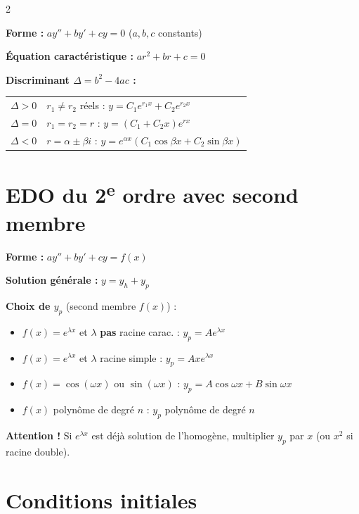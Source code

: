\documentclass[10pt,a4paper]{article}
\begin{document}
\begin{multicols}{2}
\begin{grisbox}
\textbf{Forme :} $ay'' + by' + cy = 0$ \quad ($a,b,c$ constants)

\textbf{Équation caractéristique :} $ar^2 + br + c = 0$

\textbf{Discriminant $\Delta = b^2 - 4ac$ :}

\renewcommand{\arraystretch}{1.4}
\begin{tabular}{@{}lp{4.5cm}@{}}
$\Delta > 0$ & $r_1 \neq r_2$ réels : $y = C_1 e^{r_1 x} + C_2 e^{r_2 x}$ \\
$\Delta = 0$ & $r_1 = r_2 = r$ : $y = (C_1 + C_2 x)e^{rx}$ \\
$\Delta < 0$ & $r = \alpha \pm \beta i$ : $y = e^{\alpha x}(C_1\cos\beta x + C_2\sin\beta x)$ \\
\end{tabular}
\end{grisbox}

\section{EDO du 2\textsuperscript{e} ordre avec second membre}

\begin{grisbox}
\textbf{Forme :} $ay'' + by' + cy = f(x)$

\textbf{Solution générale :} $y = y_h + y_p$

\textbf{Choix de $y_p$} (second membre $f(x)$) :
\begin{itemize}[leftmargin=1em,itemsep=1pt]
  \item $f(x)=e^{\lambda x}$ et $\lambda$ \textbf{pas} racine carac. : $y_p = Ae^{\lambda x}$
  \item $f(x)=e^{\lambda x}$ et $\lambda$ racine simple : $y_p = Axe^{\lambda x}$
  \item $f(x)=\cos(\omega x)$ ou $\sin(\omega x)$ : $y_p = A\cos\omega x + B\sin\omega x$
  \item $f(x)$ polynôme de degré $n$ : $y_p$ polynôme de degré $n$
\end{itemize}
\end{grisbox}

\begin{alertbox}
\textbf{Attention !} Si $e^{\lambda x}$ est déjà solution de l'homogène, multiplier $y_p$ par $x$ (ou $x^2$ si racine double).
\end{alertbox}

\section{Conditions initiales}


\end{multicols}
\end{document}
